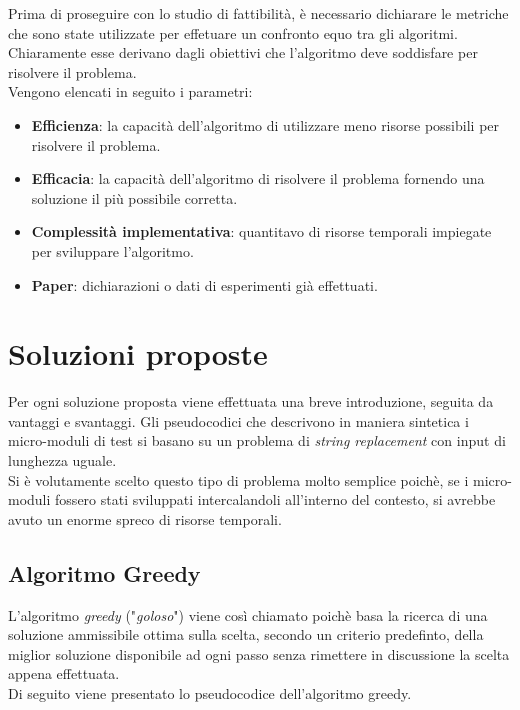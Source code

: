 \noindent Prima di proseguire con lo studio di fattibilità, è necessario dichiarare le metriche che sono state
utilizzate per effetuare un confronto equo tra gli algoritmi. Chiaramente esse derivano dagli obiettivi che
l'algoritmo deve soddisfare per risolvere il problema.\\
Vengono elencati in seguito i parametri:
\begin{itemize}
    \item \textbf{Efficienza}: la capacità dell'algoritmo di utilizzare meno risorse possibili per risolvere il problema.
    \item \textbf{Efficacia}: la capacità dell'algoritmo di risolvere il problema fornendo una soluzione il più possibile corretta.
    \item \textbf{Complessità implementativa}: quantitavo di risorse temporali impiegate per sviluppare l'algoritmo.
    \item \textbf{Paper}: dichiarazioni o dati di esperimenti già effettuati.
\end{itemize}


\section{Soluzioni proposte}
\noindent Per ogni soluzione proposta viene effettuata una breve introduzione, seguita da vantaggi e svantaggi.
Gli pseudocodici che descrivono in maniera sintetica i micro-moduli di test si basano su un problema di \textit{string replacement}
con input di lunghezza uguale.\\
Si è volutamente scelto questo tipo di problema molto semplice poichè, se i micro-moduli fossero stati sviluppati intercalandoli all'interno del contesto,
si avrebbe avuto un enorme spreco di risorse temporali.

\subsection{Algoritmo Greedy}
\noindent L'algoritmo \textit{greedy} ("\textit{goloso}") viene così chiamato poichè basa la ricerca di una
soluzione ammissibile ottima sulla scelta, secondo un criterio predefinto, della miglior soluzione disponibile ad ogni passo senza
rimettere in discussione la scelta appena effettuata.\\
Di seguito viene presentato lo pseudocodice dell'algoritmo greedy.

